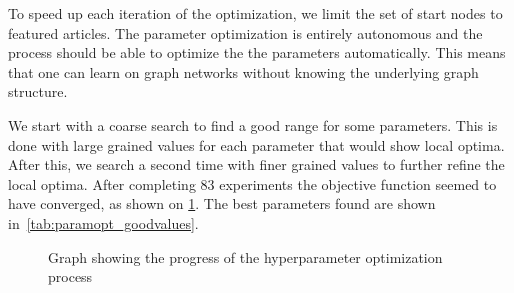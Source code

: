To speed up each iteration of the optimization, we limit the set of start nodes to featured articles. The parameter optimization is entirely autonomous and the process should be able to optimize the the parameters automatically. This means that one can learn on graph networks without knowing the underlying graph structure.

We start with a coarse search to find a good range for some parameters. This is done with large grained values for each parameter that would show local optima. After this, we search a second time with finer grained values to further refine the local optima. After completing 83 experiments the objective function seemed to have converged, as shown on \cref{fig:spearmint}. The best parameters found are shown in~\cref{tab:paramopt_goodvalues}.

\begin{figure}%
  \centering
\caption[Hyperparameter optimization]{Graph showing the progress of the hyperparameter optimization process}%
\label{fig:spearmint}%
\end{figure}

